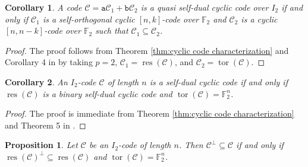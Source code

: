 \documentclass[12pt]{article}
\newtheorem{proposition}[proposition]{Proposition}
\newtheorem{corollary}[corollary]{Corollary}
\theoremstyle{definition}
\theoremstyle{plain}
\newcommand{\Blue}[1]{{ \color{blue} #1}}
\begin{document}
\begin{corollary}
A code $\mathcal{C}= \mathtt{a} \mathcal{C}_1 + \mathtt{b} \mathcal{C}_2$ is a quasi self-dual cyclic code over $I_2$ if and only if $ \mathcal{C}_ 1$ is a self-orthogonal cyclic $[n , k]$-code over $\mathbb{F}_2$ and $ \mathcal{C}_2$ is a cyclic $[n, n-k]$-code over $  \mathbb{F}  _2$ such that $ \mathcal{C}_1 \subseteq\mathcal{C}_2$.
\end{corollary}

\begin{proof}
The proof follows from Theorem \ref{thm:cyclic code characterization} and Corollary 4 in \cite{MassFormula_Ip} by taking $p=2$, $\mathcal{C}_1 = \operatorname{res}(\mathcal{C})$, and $\mathcal{C}_ 2 =  \operatorname{tor}  (\mathcal{C})$.
\end{proof}





\begin{corollary}
An $I_2$-code $\mathcal{C}$ of length $n$ is a self-dual cyclic code if and only if $\operatorname{res}(\mathcal{C})$ is a binary self-dual cyclic code and $ \operatorname{tor} (\mathcal{C}) = \mathbb{F} _2^n$.
\end{corollary}

\begin{proof}
The proof is immediate from Theorem \ref{thm:cyclic code characterization} and Theorem 5 in \cite{Duality_I2E2H2}.
\end{proof}


\begin{proposition}\label{thm:dual-containing-I2}
Let $\mathcal{C}$ be an $I_2$-code of length $n$. Then $\mathcal{C}^\perp \subseteq \mathcal{C}$ if and only if $\operatorname{res}(\mathcal{C})^\perp \subseteq \operatorname{res}(\mathcal{C})$ and $\operatorname{tor}(\mathcal{C}) = \mathbb{F}_2^n$.
\end{proposition}
\end{document}
